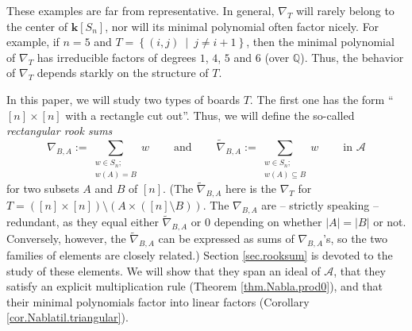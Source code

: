 \documentclass[numbers=enddot,12pt,final,onecolumn,notitlepage]{scrartcl}%
\numberwithin{exer}{subsection}
\theoremstyle{definition}
\let\sumnonlimits\sum
\renewcommand{\sum}{\sumnonlimits\limits}
\begin{document}
These examples are far from representative. In general, $\nabla_{T}$ will
rarely belong to the center of $\mathbf{k}\left[  S_{n}\right]  $, nor will
its minimal polynomial often factor nicely. For example, if $n=5$ and
$T=\left\{  \left(  i,j\right)  \ \mid\ j\neq i+1\right\}  $, then the minimal
polynomial of $\nabla_{T}$ has irreducible factors of degrees $1$, $4$, $5$
and $6$ (over $\mathbb{Q}$). Thus, the behavior of $\nabla_{T}$ depends
starkly on the structure of $T$.

In this paper, we will study two types of boards $T$. The first one has the
form \textquotedblleft$\left[  n\right]  \times\left[  n\right]  $ with a
rectangle cut out\textquotedblright. Thus, we will define the so-called
\emph{rectangular rook sums}
\[
\nabla_{B,A}:=\sum_{\substack{w\in S_{n};\\w\left(  A\right)  =B}%
}w\ \ \ \ \ \ \ \ \ \ \text{and}\ \ \ \ \ \ \ \ \ \ \widetilde{\nabla}%
_{B,A}:=\sum_{\substack{w\in S_{n};\\w\left(  A\right)  \subseteq
B}}w\ \ \ \ \ \ \ \ \ \ \text{in }\mathcal{A}%
\]
for two subsets $A$ and $B$ of $\left[  n\right]  $. (The $\widetilde{\nabla
}_{B,A}$ here is the $\nabla_{T}$ for $T=\left(  \left[  n\right]
\times\left[  n\right]  \right)  \setminus\left(  A\times\left(  \left[
n\right]  \setminus B\right)  \right)  $. The $\nabla_{B,A}$ are -- strictly
speaking -- redundant, as they equal either $\widetilde{\nabla}_{B,A}$ or $0$
depending on whether $\left\vert A\right\vert =\left\vert B\right\vert $ or
not. Conversely, however, the $\widetilde{\nabla}_{B,A}$ can be expressed as
sums of $\nabla_{B,A}$'s, so the two families of elements are closely
related.) Section \ref{sec.rooksum} is devoted to the study of these elements.
We will show that they span an ideal of $\mathcal{A}$, that they satisfy an
explicit multiplication rule (Theorem \ref{thm.Nabla.prod0}), and that their
minimal polynomials factor into linear factors (Corollary
\ref{cor.Nablatil.triangular}).
\end{document}
